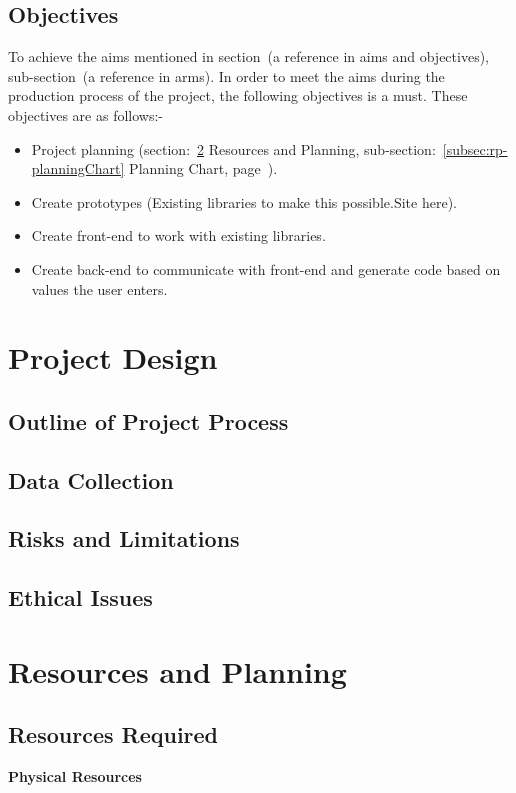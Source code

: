 \documentclass[conference]{IEEEtran}
\begin{document}
      \subsection{Objectives}
        To achieve the aims mentioned in section~(a reference in aims and objectives), sub-section~(a reference in arms). In order to meet the aims during the production process of the project, the following objectives is a must. These objectives are as follows:-
        \begin{itemize}
          \item Project planning (section:~\ref{sec: resourcesPlanning} Resources and Planning, sub-section:~\ref{subsec:rp-planningChart} Planning Chart, page~\pageref{subsec:rp-planningChart}).
          \item Create prototypes (Existing libraries to make this possible.{Site here}).
          \item Create front-end to work with existing libraries.
          \item Create back-end to communicate with front-end and generate code based on values the user enters.
        \end{itemize}
      
    \section{Project Design}
      \subsection{Outline of Project Process}
      \subsection{Data Collection}
      \subsection{Risks and Limitations}
      \subsection{Ethical Issues}
    \section{Resources and Planning}
    \label{sec: resourcesPlanning}
      \subsection{Resources Required}
        \textbf{Physical Resources}
\end{document}

